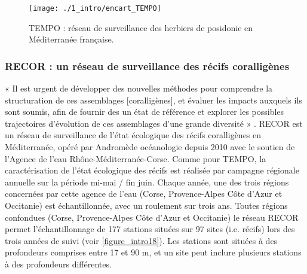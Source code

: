 \begin{landscape}
\begin{figure}[H]
	\begin{center}
	\texttt{[image: ./1\_intro/encart\_TEMPO]}
		\caption[TEMPO : réseau de surveillance des herbiers de posidonie en Méditerranée française]{TEMPO : réseau de surveillance des herbiers de posidonie en Méditerranée française.}
	\label{figure_intro17}
\end{center}
\end{figure}
\end{landscape}

\newpage

\subsubsection{RECOR : un réseau de surveillance des récifs coralligènes}\label{intro.2.3.3}

« Il est urgent de développer des nouvelles méthodes pour comprendre la structuration de ces assemblages [coralligènes], et évaluer les impacts auxquels ils sont soumis, afin de fournir des un état de référence et explorer les possibles trajectoires d’évolution de ces assemblages d’une grande diversité » \citep{kipson_rapid_2011}. RECOR est un réseau de surveillance de l’état écologique des récifs coralligènes en Méditerranée, opéré par Andromède océanologie depuis 2010 avec le soutien de l’Agence de l’eau Rhône-Méditerranée-Corse. Comme pour TEMPO, la caractérisation de l’état écologique des récifs est réalisée par campagne régionale annuelle sur la période mi-mai / fin juin. Chaque année, une des trois régions concernées par cette agence de l’eau (Corse, Provence-Alpes Côte d’Azur et Occitanie) est échantillonnée, avec un roulement sur trois ans. Toutes régions confondues (Corse, Provence-Alpes Côte d’Azur et Occitanie) le réseau RECOR permet l’échantillonnage de 177 stations situées sur 97 sites (i.e. récifs) lors des trois années de suivi (voir \autoref{figure_intro18}). Les stations sont situées à des profondeurs comprises entre 17 et 90 m, et un site peut inclure plusieurs stations à des profondeurs différentes.


